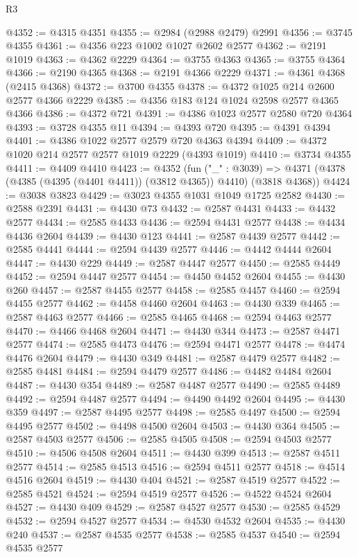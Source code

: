 \begin{lexlean}{R3}
\begin{coremodule}
@4352 := @4315 @4351
@4355 := @2984 (@2988 @2479) @2991
@4356 := @3745 @4355
@4361 := @4356 @223 @1002 @1027 @2602 @2577
@4362 := @2191 @1019
@4363 := @4362 @2229
@4364 := @3755 @4363
@4365 := @3755 @4364
@4366 := @2190 @4365
@4368 := @2191 @4366 @2229
@4371 := @4361 @4368 (@2415 @4368)
@4372 := @3700 @4355
@4378 := @4372 @1025 @214 @2600 @2577 @4366 @2229
@4385 := @4356 @183 @124 @1024 @2598 @2577 @4365 @4366
@4386 := @4372 @721
@4391 := @4386 @1023 @2577 @2580 @720 @4364
@4393 := @3728 @4355 @11
@4394 := @4393 @720
@4395 := @4391 @4394
@4401 := @4386 @1022 @2577 @2579 @720 @4363 @4394
@4409 := @4372 @1020 @214 @2577 @2577 @1019 @2229 (@4393 @1019)
@4410 := @3734 @4355
@4411 := @4409 @4410
@4423 := @4352
    (fun ("_" : @3039) =>
    @4371 (@4378 (@4385 (@4395 (@4401 @4411)) (@3812 @4365)) @4410) (@3818 @4368))
@4424 := @3038 @3823
@4429 := @3023 @4355 @1031 @1049 @1725 @2582
@4430 := @2588 @2391
@4431 := @4430 @73
@4432 := @2587 @4431
@4433 := @4432 @2577
@4434 := @2585 @4433
@4436 := @2594 @4431 @2577
@4438 := @4434 @4436 @2604
@4439 := @4430 @123
@4441 := @2587 @4439 @2577
@4442 := @2585 @4441
@4444 := @2594 @4439 @2577
@4446 := @4442 @4444 @2604
@4447 := @4430 @229
@4449 := @2587 @4447 @2577
@4450 := @2585 @4449
@4452 := @2594 @4447 @2577
@4454 := @4450 @4452 @2604
@4455 := @4430 @260
@4457 := @2587 @4455 @2577
@4458 := @2585 @4457
@4460 := @2594 @4455 @2577
@4462 := @4458 @4460 @2604
@4463 := @4430 @339
@4465 := @2587 @4463 @2577
@4466 := @2585 @4465
@4468 := @2594 @4463 @2577
@4470 := @4466 @4468 @2604
@4471 := @4430 @344
@4473 := @2587 @4471 @2577
@4474 := @2585 @4473
@4476 := @2594 @4471 @2577
@4478 := @4474 @4476 @2604
@4479 := @4430 @349
@4481 := @2587 @4479 @2577
@4482 := @2585 @4481
@4484 := @2594 @4479 @2577
@4486 := @4482 @4484 @2604
@4487 := @4430 @354
@4489 := @2587 @4487 @2577
@4490 := @2585 @4489
@4492 := @2594 @4487 @2577
@4494 := @4490 @4492 @2604
@4495 := @4430 @359
@4497 := @2587 @4495 @2577
@4498 := @2585 @4497
@4500 := @2594 @4495 @2577
@4502 := @4498 @4500 @2604
@4503 := @4430 @364
@4505 := @2587 @4503 @2577
@4506 := @2585 @4505
@4508 := @2594 @4503 @2577
@4510 := @4506 @4508 @2604
@4511 := @4430 @399
@4513 := @2587 @4511 @2577
@4514 := @2585 @4513
@4516 := @2594 @4511 @2577
@4518 := @4514 @4516 @2604
@4519 := @4430 @404
@4521 := @2587 @4519 @2577
@4522 := @2585 @4521
@4524 := @2594 @4519 @2577
@4526 := @4522 @4524 @2604
@4527 := @4430 @409
@4529 := @2587 @4527 @2577
@4530 := @2585 @4529
@4532 := @2594 @4527 @2577
@4534 := @4530 @4532 @2604
@4535 := @4430 @240
@4537 := @2587 @4535 @2577
@4538 := @2585 @4537
@4540 := @2594 @4535 @2577

\end{coremodule}
\end{lexlean}
